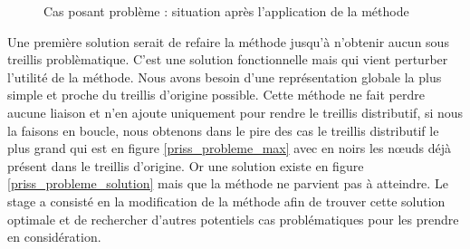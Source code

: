 \begin{figure}[H]
	\begin{center}
	\end{center}
	\caption{Cas posant problème : situation après l'application de la méthode}
	\label{priss_probleme_1}
\end{figure}

Une première solution serait de refaire la méthode jusqu'à n'obtenir aucun sous treillis problèmatique. C'est une solution fonctionnelle mais qui vient perturber l'utilité de la méthode. Nous avons besoin d'une représentation globale la plus simple et proche du treillis d'origine possible. Cette méthode ne fait perdre aucune liaison et n'en ajoute uniquement pour rendre le treillis distributif, si nous la faisons en boucle, nous obtenons dans le pire des cas le treillis distributif le plus grand qui est en figure \ref{priss_probleme_max} avec en noirs les n\oe uds déjà présent dans le treillis d'origine. Or une solution existe en figure \ref{priss_probleme_solution} mais que la méthode ne parvient pas à atteindre. Le stage a consisté en la modification de la méthode afin de trouver cette solution optimale et de rechercher d'autres potentiels cas problématiques pour les prendre en considération.

